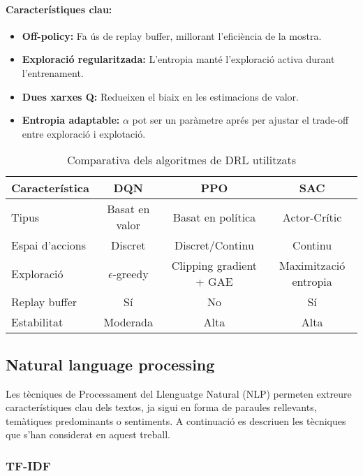 \documentclass[12pt,a4paper,twoside]{book}
\begin{document}
\paragraph{Característiques clau:}

\begin{itemize}
  \item \textbf{Off-policy:} Fa ús de replay buffer, millorant l'eficiència de la mostra.
  \item \textbf{Exploració regularitzada:} L'entropia manté l'exploració activa durant l'entrenament.
  \item \textbf{Dues xarxes Q:} Redueixen el biaix en les estimacions de valor.
  \item \textbf{Entropia adaptable:} $\alpha$ pot ser un paràmetre aprés per ajustar el trade-off entre exploració i explotació.
\end{itemize}




\begin{table}[h]
\centering
\caption{Comparativa dels algoritmes de DRL utilitzats}
\begin{tabular}{lccc}
\hline
\textbf{Característica} & \textbf{DQN} & \textbf{PPO} & \textbf{SAC} \\ \hline
Tipus & Basat en valor & Basat en política & Actor-Crític \\
Espai d'accions & Discret & Discret/Continu & Continu \\
Exploració & $\epsilon$-greedy & Clipping gradient + GAE & Maximització entropia \\
Replay buffer & Sí & No & Sí \\
Estabilitat & Moderada & Alta & Alta \\ \hline
\end{tabular}
\label{tab:comparativa_algoritmes}
\end{table}



\subsection{Natural language processing}

 Les tècniques de Processament del Llenguatge Natural (NLP) permeten extreure característiques clau dels textos, ja sigui en forma de paraules rellevants, temàtiques predominants o sentiments. A continuació es descriuen les tècniques que s'han considerat en aquest treball.

\subsubsection{TF-IDF}
\end{document}
